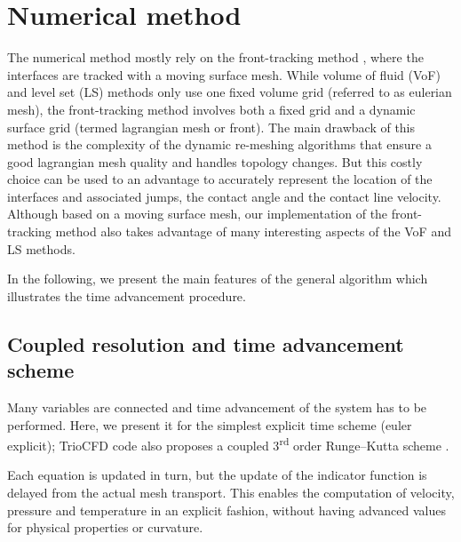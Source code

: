 \documentclass[]{article}
\begin{document}
\section{Numerical method}
The numerical method mostly rely on the front-tracking method \parencite{Bunner2003}, where the interfaces are tracked with 
a moving surface mesh. While volume of fluid (VoF) and level set (LS) methods only use one fixed volume grid (referred 
to as eulerian mesh), the front-tracking method involves both a fixed grid and a dynamic surface grid (termed lagrangian 
mesh or front). The main drawback of this method is the complexity of the dynamic re-meshing algorithms that ensure a good 
lagrangian mesh quality and handles topology changes. But this costly choice can be used to an advantage to accurately 
represent the location of the interfaces and associated jumps, the contact angle and the contact line velocity. Although based on a moving surface mesh, our implementation of the front-tracking method also takes advantage of many 
interesting aspects of the VoF and LS methods.

In the following, we present the main features of the general algorithm which illustrates the time advancement procedure. 

\subsection{Coupled resolution and time advancement scheme}
Many variables are connected and time advancement of the system has to be performed. Here, we present it 
for the simplest explicit time scheme (euler explicit); TrioCFD code also proposes a coupled 
3\textsuperscript{rd} order Runge--Kutta scheme \parencite{Toutant2006th}.

Each equation is updated in turn, but the update of the indicator function is delayed from the actual mesh transport. This enables the computation of velocity, pressure and temperature in an explicit fashion, without having advanced values for physical properties or curvature. 
\end{document}
